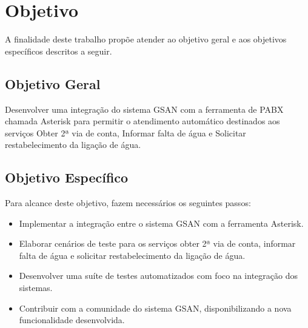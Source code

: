 \section*{Objetivo}

A finalidade deste trabalho propõe atender ao objetivo geral e aos objetivos específicos descritos a seguir.

\subsection*{Objetivo Geral}

Desenvolver uma integração do sistema GSAN com a ferramenta de PABX chamada Asterisk para permitir o atendimento automático destinados aos serviços Obter 2ª via de conta, Informar falta de água e Solicitar restabelecimento da ligação de água.

\subsection*{Objetivo Específico}
Para alcance deste objetivo, fazem necessários os seguintes passos:
\begin{itemize}
	\item Implementar a integração entre o sistema GSAN com a ferramenta Asterisk.
	\item Elaborar cenários de teste para os serviços obter 2ª via de conta, informar falta de água e solicitar restabelecimento da ligação de água.
	\item Desenvolver uma suíte de testes automatizados com foco na integração dos sistemas. 
	\item Contribuir com a comunidade do sistema GSAN, disponibilizando a nova funcionalidade desenvolvida.
\end{itemize}